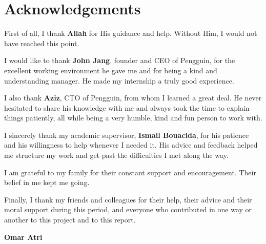 \chapter*{Acknowledgements}
\thispagestyle{empty}

First of all, I thank \textbf{Allah} for His guidance and help. Without Him, I would not have reached this point.

I would like to thank \textbf{John Jang}, founder and CEO of Pengguin, for the excellent working environment he gave me and for being a kind and understanding manager. He made my internship a truly good experience.

I also thank \textbf{Aziz}, CTO of Pengguin, from whom I learned a great deal. He never hesitated to share his knowledge with me and always took the time to explain things patiently, all while being a very humble, kind and fun person to work with.

I sincerely thank my academic supervisor, \textbf{Ismail Bouacida}, for his patience and his willingness to help whenever I needed it. His advice and feedback helped me structure my work and get past the difficulties I met along the way.

I am grateful to my family for their constant support and encouragement. Their belief in me kept me going.

Finally, I thank my friends and colleagues for their help, their advice and their moral support during this period, and everyone who contributed in one way or another to this project and to this report.

\vspace{1.5cm}

\begin{flushright}
\textbf{Omar Atri}
\end{flushright}

\newpage
